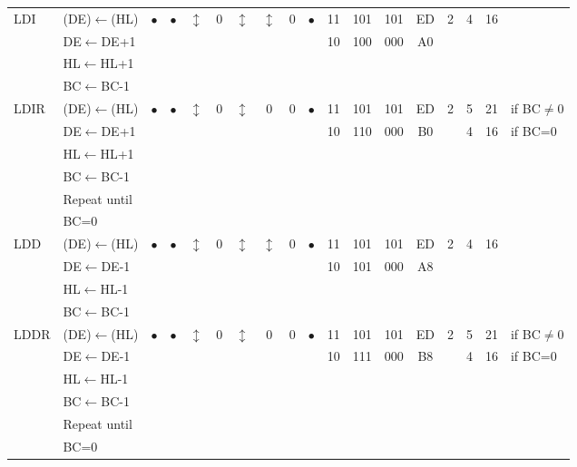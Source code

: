\documentclass[oneside,a4paper]{book}
\newcommand{\instrt}{\rule{0pt}{2.7ex}}
\newcommand{\instrb}{\rule[-1.7ex]{0pt}{0pt}}
\begin{document}
{\begin{tabular}{llcccccccccccccccl}
		LDI\instrt & 
			(DE)$\leftarrow$(HL) & 
			$\bullet$ & 
				$\bullet$ & 
				$\updownarrow$\footnotemark[4] & 
				0 & 
				$\updownarrow$\footnotemark[4] & 
				$\updownarrow$\footnotemark[1] & 
				0 & 
				$\bullet$ & 
			11 & 101 & 101 & 
			ED & 2 & 
			4 & 16 \\ 
		& DE$\leftarrow$DE+1 & \multicolumn{8}{c}{} & 10 & 100 & 000 & A0 & & & \\ 
		& HL$\leftarrow$HL+1 & \\
		& BC$\leftarrow$BC-1 & \\ [4pt]

		LDIR\instrt & 
			(DE)$\leftarrow$(HL) & 
			$\bullet$ & 
				$\bullet$ &
				$\updownarrow$\footnotemark[4] & 
				0 & 
				$\updownarrow$\footnotemark[4] & 
				0\footnotemark[2] & 
				0 & 
				$\bullet$ & 
			11 & 101 & 101 & 
			ED & 2 & 
			5 & 21 & {if BC$\not=$0} \\
		& DE$\leftarrow$DE+1 & \multicolumn{8}{c}{} & 10 & 110 & 000 & B0 & & 4 & 16 & {if BC=0} \\
		& HL$\leftarrow$HL+1 & \\
		& BC$\leftarrow$BC-1 & \\ 
		& Repeat until & \\ 
		& BC=0 & \instrb \\

		LDD\instrt & 
			(DE)$\leftarrow$(HL) & 
			$\bullet$ & 
				$\bullet$ & 
				$\updownarrow$\footnotemark[4] & 
				0 & 
				$\updownarrow$\footnotemark[4] & 
				$\updownarrow$\footnotemark[1] & 
				0 & 
				$\bullet$ & 
			11 & 101 & 101 & 
			ED & 2 & 
			4 & 16 & \\ 
		& DE$\leftarrow$DE-1 & \multicolumn{8}{c}{} & 10 & 101 & 000 & A8 & & \\ 
		& HL$\leftarrow$HL-1 & \\
		& BC$\leftarrow$BC-1 & \instrb \\

		LDDR\instrt & 
			(DE)$\leftarrow$(HL) & 
			$\bullet$ & 
				$\bullet$ & 
				$\updownarrow$\footnotemark[4] & 
				0 & 
				$\updownarrow$\footnotemark[4] & 
				0\footnotemark[2] & 
				0 & 
				$\bullet$ & 
			11 & 101 & 101 & 
			ED & 2 & 
			5 & 21 & {if BC$\not=$0} \\ 
		& DE$\leftarrow$DE-1 & \multicolumn{8}{c}{} & 10 & 111 & 000 & B8 & & 4 & 16 & {if BC=0} \\
		& HL$\leftarrow$HL-1 & \\
		& BC$\leftarrow$BC-1 & \\ 
		& Repeat until & \\ 
		& BC=0 & \instrb \\


\end{tabular}}
\end{document}
